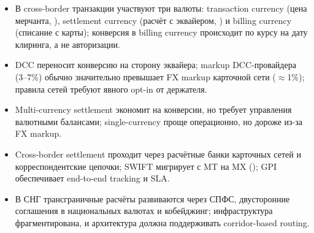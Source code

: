 \begin{itemize}
  \item В cross-border транзакции участвуют три валюты:
        transaction currency (цена мерчанта, ),
        settlement currency (расчёт с эквайером, )
        и billing currency (списание с карты); конверсия
        в billing currency происходит по курсу на дату
        клиринга, а не авторизации.
  \item DCC переносит конверсию на сторону эквайера; markup DCC-провайдера (3--7\%) обычно значительно превышает FX markup
        карточной сети ($\approx$1\%); правила сетей требуют явного opt-in от держателя.
  \item Multi-currency settlement экономит на конверсии, но требует управления валютными балансами; single-currency проще
        операционно, но дороже из-за FX markup.
  \item Cross-border settlement проходит через расчётные банки карточных сетей и корреспондентские цепочки; SWIFT мигрирует с
        MT на MX (); GPI обеспечивает end-to-end tracking и SLA.
  \item В СНГ трансграничные расчёты развиваются через
        СПФС, двусторонние соглашения в национальных валютах
        и кобейджинг; инфраструктура фрагментирована,
        и архитектура должна поддерживать corridor-based
        routing.
\end{itemize}

